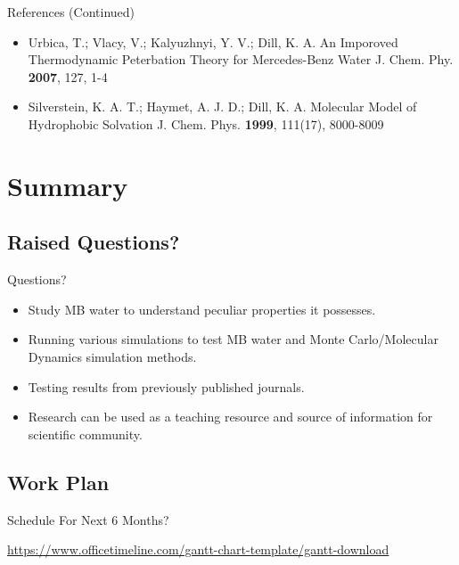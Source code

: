 \documentclass{beamer}
\begin{document}
\begin{frame}{References (Continued)}
\begin{itemize}
  \item Urbica, T.; Vlacy, V.; Kalyuzhnyi, Y. V.; Dill, K. A. An Imporoved Thermodynamic Peterbation Theory for Mercedes-Benz Water J. Chem. Phy. \textbf{2007}, 127, 1-4
  \item Silverstein, K. A. T.; Haymet, A. J. D.; Dill, K. A. Molecular Model of Hydrophobic Solvation J. Chem. Phys. \textbf{1999}, 111(17), 8000-8009 
\end{itemize}
\end{frame}



\section{Summary}

\subsection{Raised Questions?}
\begin{frame}{Questions?}
\begin{itemize}
  \item Study MB water to understand peculiar properties it possesses.
  \item Running various simulations to test MB water and Monte Carlo/Molecular Dynamics simulation methods.
  \item Testing results from previously published journals.
  \item Research can be used as a teaching resource and source of information for scientific community.
\end{itemize}
\end{frame}

\subsection{Work Plan}
\begin{frame}{Schedule For Next 6 Months?}


\url{https://www.officetimeline.com/gantt-chart-template/gantt-download}

\end{frame}
\end{document}
